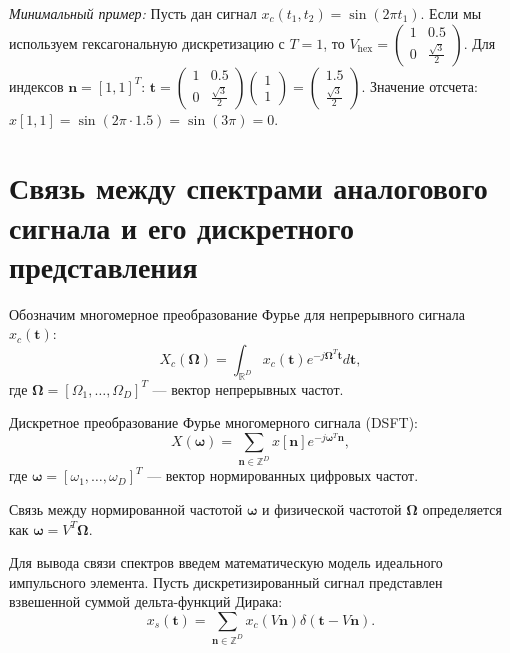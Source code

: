 \documentclass[12pt, a4paper]{article}
\begin{document}
\textit{Минимальный пример:} Пусть дан сигнал $x_c(t_1, t_2) = \sin(2\pi t_1)$. Если мы используем гексагональную дискретизацию с $T=1$, то $V_{\text{hex}} = \begin{pmatrix} 1 & 0.5 \\ 0 & \frac{\sqrt{3}}{2} \end{pmatrix}$. Для индексов $\mathbf{n} = [1, 1]^T$:
$\mathbf{t} = \begin{pmatrix} 1 & 0.5 \\ 0 & \frac{\sqrt{3}}{2} \end{pmatrix} \begin{pmatrix} 1 \\ 1 \end{pmatrix} = \begin{pmatrix} 1.5 \\ \frac{\sqrt{3}}{2} \end{pmatrix}$.
Значение отсчета: $x[1, 1] = \sin(2\pi \cdot 1.5) = \sin(3\pi) = 0$.

\section{Связь между спектрами аналогового сигнала и его дискретного представления}

Обозначим многомерное преобразование Фурье для непрерывного сигнала $x_c(\mathbf{t})$:
\begin{equation}
    X_c(\boldsymbol{\Omega}) = \int_{\mathbb{R}^D} x_c(\mathbf{t}) e^{-j \boldsymbol{\Omega}^T \mathbf{t}} d\mathbf{t},
\end{equation}
где $\boldsymbol{\Omega} = [\Omega_1, \dots, \Omega_D]^T$ --- вектор непрерывных частот.

Дискретное преобразование Фурье многомерного сигнала (DSFT):
\begin{equation}
    X(\boldsymbol{\omega}) = \sum_{\mathbf{n} \in \mathbb{Z}^D} x[\mathbf{n}] e^{-j \boldsymbol{\omega}^T \mathbf{n}},
\end{equation}
где $\boldsymbol{\omega} = [\omega_1, \dots, \omega_D]^T$ --- вектор нормированных цифровых частот.

Связь между нормированной частотой $\boldsymbol{\omega}$ и физической частотой $\boldsymbol{\Omega}$ определяется как $\boldsymbol{\omega} = V^T \boldsymbol{\Omega}$.

Для вывода связи спектров введем математическую модель идеального импульсного элемента. Пусть дискретизированный сигнал представлен взвешенной суммой дельта-функций Дирака:
\begin{equation}
    x_s(\mathbf{t}) = \sum_{\mathbf{n} \in \mathbb{Z}^D} x_c(V \mathbf{n}) \delta(\mathbf{t} - V \mathbf{n}).
\end{equation}
\end{document}
